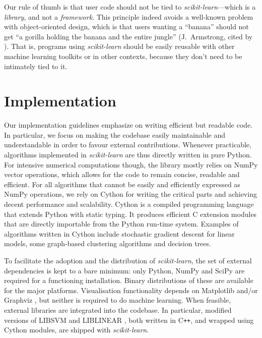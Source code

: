 \documentclass{llncs}
\newcommand{\sklearn}{\textit{scikit-learn}\xspace}
\begin{document}
Our rule of thumb is that user code should not be tied to \sklearn---which is a
\textit{library}, and not a \textit{framework}. This principle indeed avoids a
well-known problem with object-oriented design, which is that users wanting a
``banana'' should not get ``a gorilla holding the banana and the entire jungle''
(J.~Armstrong, cited by \citealp[p.~213]{seibel2009coders}).  That is, programs
using \sklearn should be easily reusable with other machine learning toolkits or
in other contexts, because they don't need to be intimately tied to it.


\section{Implementation}
\label{sec:implementation}

Our implementation guidelines emphasize on writing efficient but readable code.
In particular, we focus on making the codebase easily maintainable and
understandable in order to favour external contributions. Whenever practicable,
algorithms implemented in \sklearn are thus directly written in pure Python. For
intensive numerical computations though, the library mostly relies on NumPy
vector operations, which allows for the code to remain concise, readable and
efficient. For all algorithms that cannot be easily and efficiently expressed as
NumPy operations, we rely on Cython \citep{behnel2011cython}  for writing the
critical parts and achieving decent performance and scalability. Cython is a
compiled programming language that extends Python with static typing. It
produces efficient C extension modules that are directly importable from the
Python run-time system. Examples of algorithms written in Cython include
stochastic gradient descent for linear models, some graph-based clustering
algorithms and decision trees.

To facilitate the adoption and the distribution of \sklearn,
the set of external dependencies is kept to a bare minimum:
only Python, NumPy and SciPy are required for a functioning installation.
Binary distributions of these are available for the major platforms.
Visualisation functionality depends on Matplotlib \citep{hunter2007matplotlib}
and/or Graphviz \citep{gansner2000},
but neither is required to do machine learning.
When feasible, external libraries are integrated into the codebase.
In particular, modified versions of \textsf{LIBSVM} and \textsf{LIBLINEAR}
\citep{chang2011libsvm,fan2008}, both written in C{}\verb!++!,
and wrapped using Cython modules, are shipped with \sklearn.
\end{document}
